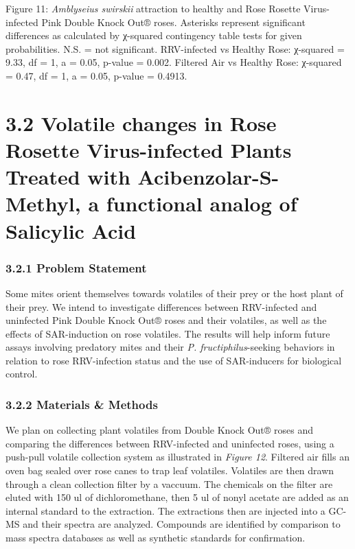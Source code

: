 \documentclass[12pt,final,CPage]{ufthesis}
\begin{document}
{  Figure 11: \emph{Amblyseius swirskii} attraction to healthy and Rose Rosette Virus-infected Pink Double Knock Out® roses. Asterisks represent significant differences as calculated by χ-squared contingency table tests for given probabilities. N.S. = not significant. RRV-infected vs Healthy Rose: χ-squared = 9.33, df = 1, a = 0.05, p-value = 0.002. Filtered Air vs Healthy Rose: χ-squared = 0.47, df = 1, a = 0.05, p-value = 0.4913.

  \hypertarget{swirskii-trials}{%
  \section{3.2 Volatile changes in Rose Rosette Virus-infected Plants Treated with Acibenzolar-S-Methyl, a functional analog of Salicylic Acid}\label{swirskii-trials}}

  \hypertarget{problem-statement-2}{%
  \subsubsection{3.2.1 Problem Statement}\label{problem-statement-2}}

  Some mites orient themselves towards volatiles of their prey or the host plant of their prey. We intend to investigate differences between RRV-infected and uninfected Pink Double Knock Out® roses and their volatiles, as well as the effects of SAR-induction on rose volatiles. The results will help inform future assays involving predatory mites and their \emph{P. fructiphilus}-seeking behaviors in relation to rose RRV-infection status and the use of SAR-inducers for biological control.

  \hypertarget{materials-methods-1}{%
  \subsubsection{3.2.2 Materials \& Methods}\label{materials-methods-1}}

  We plan on collecting plant volatiles from Double Knock Out® roses and comparing the differences between RRV-infected and uninfected roses, using a push-pull volatile collection system as illustrated in \emph{Figure 12}. Filtered air fills an oven bag sealed over rose canes to trap leaf volatiles. Volatiles are then drawn through a clean collection filter by a vaccuum. The chemicals on the filter are eluted with 150 ul of dichloromethane, then 5 ul of nonyl acetate are added as an internal standard to the extraction. The extractions then are injected into a GC-MS and their spectra are analyzed. Compounds are identified by comparison to mass spectra databases as well as synthetic standards for confirmation.

}
\end{document}
